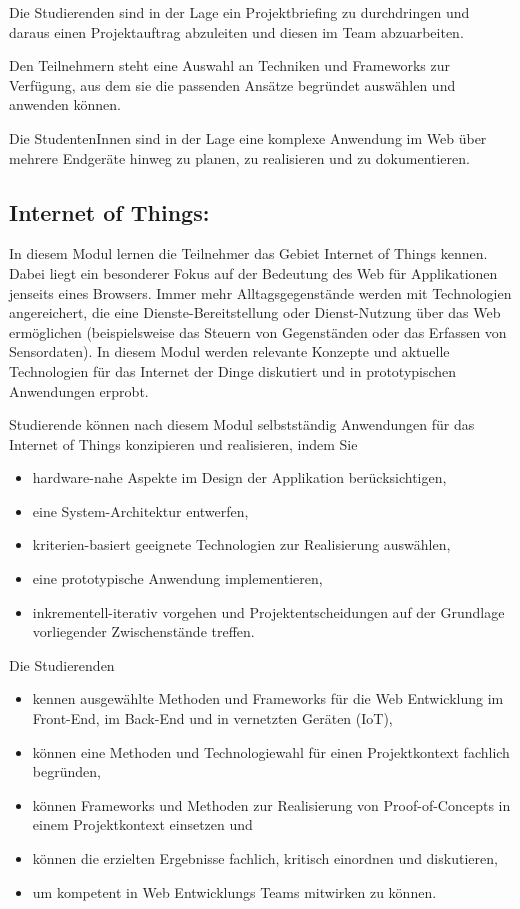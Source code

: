 Die Studierenden sind in der Lage ein Projektbriefing zu durchdringen
und daraus einen Projektauftrag abzuleiten und diesen im Team
abzuarbeiten.

Den Teilnehmern steht eine Auswahl an Techniken und Frameworks zur
Verfügung, aus dem sie die passenden Ansätze begründet auswählen und
anwenden können.

Die StudentenInnen sind in der Lage eine komplexe Anwendung im Web über
mehrere Endgeräte hinweg zu planen, zu realisieren und zu dokumentieren.

\subsection*{Internet of Things:}\label{internet-of-things}

In diesem Modul lernen die Teilnehmer das Gebiet Internet of Things
kennen. Dabei liegt ein besonderer Fokus auf der Bedeutung des Web für
Applikationen jenseits eines Browsers. Immer mehr Alltagsgegenstände
werden mit Technologien angereichert, die eine Dienste-Bereitstellung
oder Dienst-Nutzung über das Web ermöglichen (beispielsweise das Steuern
von Gegenständen oder das Erfassen von Sensordaten). In diesem Modul
werden relevante Konzepte und aktuelle Technologien für das Internet der
Dinge diskutiert und in prototypischen Anwendungen erprobt.

Studierende können nach diesem Modul selbstständig Anwendungen für das
Internet of Things konzipieren und realisieren, indem Sie

\begin{itemize}
\item
  hardware-nahe Aspekte im Design der Applikation berücksichtigen,
\item
  eine System-Architektur entwerfen,
\item
  kriterien-basiert geeignete Technologien zur Realisierung auswählen,
\item
  eine prototypische Anwendung implementieren,
\item
  inkrementell-iterativ vorgehen und Projektentscheidungen auf der
  Grundlage vorliegender Zwischenstände treffen.
\end{itemize}

Die Studierenden

\begin{itemize}
\item
  kennen ausgewählte Methoden und Frameworks für die Web Entwicklung im
  Front-End, im Back-End und in vernetzten Geräten (IoT),
\item
  können eine Methoden und Technologiewahl für einen Projektkontext
  fachlich begründen,
\item
  können Frameworks und Methoden zur Realisierung von Proof-of-Concepts
  in einem Projektkontext einsetzen und
\item
  können die erzielten Ergebnisse fachlich, kritisch einordnen und
  diskutieren,
\item
  um kompetent in Web Entwicklungs Teams mitwirken zu können.
\end{itemize}

